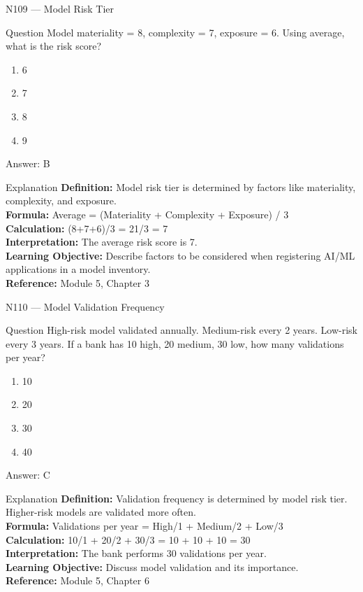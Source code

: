 \documentclass[aspectratio=169,8pt]{beamer}
\begin{document}
	\begin{frame}{N109 --- Model Risk Tier}
		\begin{block}{Question}
			Model materiality = 8, complexity = 7, exposure = 6. Using average, what is the risk score?
			\begin{enumerate}
				\item 6
				\item 7
				\item 8
				\item 9
			\end{enumerate}
		\end{block}
		\begin{exampleblock}{Answer: B}\end{exampleblock}
		\begin{block}{Explanation}
			\textbf{Definition:} Model risk tier is determined by factors like materiality, complexity, and exposure.\\
			\textbf{Formula:} Average = (Materiality + Complexity + Exposure) / 3\\
			\textbf{Calculation:} (8+7+6)/3 = 21/3 = 7\\
			\textbf{Interpretation:} The average risk score is 7.\\
			\textbf{Learning Objective:} Describe factors to be considered when registering AI/ML applications in a model inventory.\\
			\textbf{Reference:} Module 5, Chapter 3
		\end{block}
	\end{frame}
	
	\begin{frame}{N110 --- Model Validation Frequency}
		\begin{block}{Question}
			High-risk model validated annually. Medium-risk every 2 years. Low-risk every 3 years. If a bank has 10 high, 20 medium, 30 low, how many validations per year?
			\begin{enumerate}
				\item 10
				\item 20
				\item 30
				\item 40
			\end{enumerate}
		\end{block}
		\begin{exampleblock}{Answer: C}\end{exampleblock}
		\begin{block}{Explanation}
			\textbf{Definition:} Validation frequency is determined by model risk tier. Higher-risk models are validated more often.\\
			\textbf{Formula:} Validations per year = High/1 + Medium/2 + Low/3\\
			\textbf{Calculation:} 10/1 + 20/2 + 30/3 = 10 + 10 + 10 = 30\\
			\textbf{Interpretation:} The bank performs 30 validations per year.\\
			\textbf{Learning Objective:} Discuss model validation and its importance.\\
			\textbf{Reference:} Module 5, Chapter 6
		\end{block}
	\end{frame}
	
\end{document}
